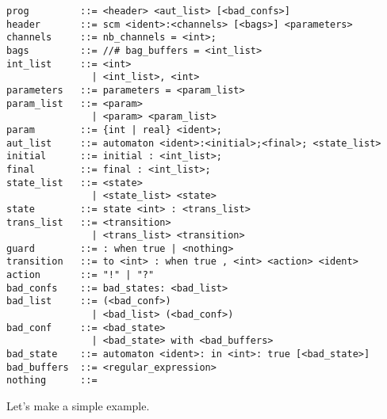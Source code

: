 \bigskip

\begin{lstlisting}[language={},caption={Modified SCM grammar},
    keywordstyle=\color{blue}\bfseries,label={lst:scm-grammar}] 
prog         ::= <header> <aut_list> [<bad_confs>]
header       ::= scm <ident>:<channels> [<bags>] <parameters>
channels     ::= nb_channels = <int>;
bags         ::= //# bag_buffers = <int_list>
int_list     ::= <int>
               | <int_list>, <int>
parameters   ::= parameters = <param_list>
param_list   ::= <param>
               | <param> <param_list>
param        ::= {int | real} <ident>;
aut_list     ::= automaton <ident>:<initial>;<final>; <state_list>
initial      ::= initial : <int_list>;
final        ::= final : <int_list>;
state_list   ::= <state>
               | <state_list> <state>
state        ::= state <int> : <trans_list>
trans_list   ::= <transition>
               | <trans_list> <transition>
guard        ::= : when true | <nothing>
transition   ::= to <int> : when true , <int> <action> <ident>
action       ::= "!" | "?"
bad_confs    ::= bad_states: <bad_list>
bad_list     ::= (<bad_conf>)
               | <bad_list> (<bad_conf>)
bad_conf     ::= <bad_state>
               | <bad_state> with <bad_buffers>
bad_state    ::= automaton <ident>: in <int>: true [<bad_state>]
bad_buffers  ::= <regular_expression>
nothing      ::= 
\end{lstlisting}

Let's make a simple example.

\bigskip

